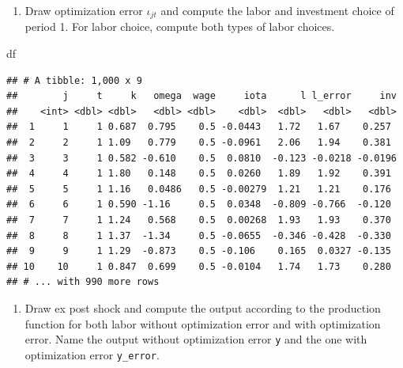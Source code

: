 \documentclass[
]{book}
\newenvironment{Shaded}{\begin{snugshade}}{\end{snugshade}}
\newcommand{\NormalTok}[1]{#1}
\providecommand{\tightlist}{%
  \setlength{\itemsep}{0pt}\setlength{\parskip}{0pt}}
\begin{document}
\begin{enumerate}
\def\labelenumi{\arabic{enumi}.}
\setcounter{enumi}{6}
\tightlist
\item
  Draw optimization error \(\iota_{jt}\) and compute the labor and investment choice of period 1. For labor choice, compute both types of labor choices.
\end{enumerate}

\begin{Shaded}
\begin{Highlighting}[]
\NormalTok{df}
\end{Highlighting}
\end{Shaded}

\begin{verbatim}
## # A tibble: 1,000 x 9
##        j     t     k   omega  wage     iota      l l_error     inv
##    <int> <dbl> <dbl>   <dbl> <dbl>    <dbl>  <dbl>   <dbl>   <dbl>
##  1     1     1 0.687  0.795    0.5 -0.0443   1.72   1.67    0.257 
##  2     2     1 1.09   0.779    0.5 -0.0961   2.06   1.94    0.381 
##  3     3     1 0.582 -0.610    0.5  0.0810  -0.123 -0.0218 -0.0196
##  4     4     1 1.80   0.148    0.5  0.0260   1.89   1.92    0.391 
##  5     5     1 1.16   0.0486   0.5 -0.00279  1.21   1.21    0.176 
##  6     6     1 0.590 -1.16     0.5  0.0348  -0.809 -0.766  -0.120 
##  7     7     1 1.24   0.568    0.5  0.00268  1.93   1.93    0.370 
##  8     8     1 1.37  -1.34     0.5 -0.0655  -0.346 -0.428  -0.330 
##  9     9     1 1.29  -0.873    0.5 -0.106    0.165  0.0327 -0.135 
## 10    10     1 0.847  0.699    0.5 -0.0104   1.74   1.73    0.280 
## # ... with 990 more rows
\end{verbatim}

\begin{enumerate}
\def\labelenumi{\arabic{enumi}.}
\setcounter{enumi}{7}
\tightlist
\item
  Draw ex post shock and compute the output according to the production function for both labor without optimization error and with optimization error. Name the output without optimization error \texttt{y} and the one with optimization error \texttt{y\_error}.
\end{enumerate}
\end{document}
